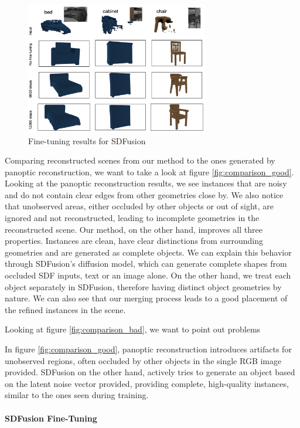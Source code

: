 \begin{figure}[H]
  \centering
  \includegraphics[width=80mm, scale=1]{images/image4.png}
  \caption{Fine-tuning results for SDFusion}
\end{figure}

Comparing reconstructed scenes from our method to the ones generated by panoptic reconstruction, we want to take a look at figure \ref{fig:comparison_good}. Looking at the panoptic reconstruction results, we see instances that are noisy and do not contain clear edges from other geometries close by. We also notice that unobserved areas, either occluded by other objects or out of sight, are ignored and not reconstructed, leading to incomplete geometries in the reconstructed scene. Our method, on the other hand, improves all three properties. Instances are clean, have clear distinctions from surrounding geometries and are generated as complete objects. We can explain this behavior through SDFusion's diffusion model, which can generate complete shapes from occluded SDF inputs, text or an image alone. On the other hand, we treat each object separately in SDFusion, therefore having distinct object geometries by nature.
We can also see that our merging process leads to a good placement of the refined instances in the scene. 

Looking at figure \ref{fig:comparison_bad}, we want to point out problems 

In figure \ref{fig:comparison_good}, panoptic reconstruction introduces artifacts for unobserved regions, often occluded by other objects in the single RGB image provided. SDFusion on the other hand, actively tries to generate an object based on the latent noise vector provided, providing complete, high-quality instances, similar to the ones seen during training. 


\paragraph{SDFusion Fine-Tuning}